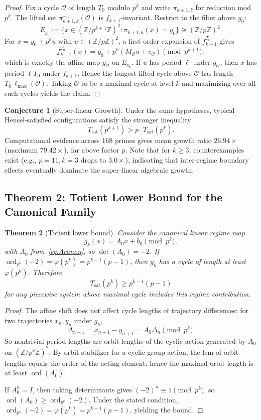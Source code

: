 \documentclass[11pt]{article}
\theoremstyle{plain}
\newtheorem{theorem}{Theorem}[section]
\theoremstyle{definition}
\newtheorem{conjecture}[theorem]{Conjecture}
\newcommand{\Z}{\mathbb{Z}}
\begin{document}
\begin{proof}
Fix a cycle $\mathcal{O}$ of length $T_0$ modulo $p^k$ and write $\pi_{k+1,k}$ for reduction mod $p^k$. The lifted set $\pi_{k+1,k}^{-1}(\mathcal{O})$ is $f_{k+1}$-invariant. Restrict to the fiber above $y_0$:
\[
E_{y_0}:=\{x\in(\Z/p^{k+1}\Z)^2:\pi_{k+1,k}(x)=y_0\}\cong(\Z/p\Z)^2.
\]
For $x=y_0+p^ku$ with $u\in(\Z/p\Z)^2$, a first-order expansion of $f_{k+1}^{T_0}$ gives
\[
f_{k+1}^{T_0}(x)=y_0+p^k(M_{\mathcal{O}}u+c_{\mathcal{O}})\pmod{p^{k+1}},
\]
which is exactly the affine map $g_{\mathcal{O}}$ on $E_{y_0}$. If $u$ has period $\ell$ under $g_{\mathcal{O}}$, then $x$ has period $\ell T_0$ under $f_{k+1}$. Hence the longest lifted cycle above $\mathcal{O}$ has length $T_0\,\ell_{\max}(\mathcal{O})$. Taking $\mathcal{O}$ to be a maximal cycle at level $k$ and maximizing over all such cycles yields the claim.
\end{proof}

\begin{conjecture}[Super-linear Growth]
\label{conj:superlinear_growth}
Under the same hypotheses, typical Hensel-satisfied configurations satisfy the stronger inequality
\[
T_{\mathrm{sat}}(p^{k+1}) > p\cdot T_{\mathrm{sat}}(p^k).
\]
Computational evidence across 168 primes gives mean growth ratio $26.94\times$ (maximum $79.42\times$), far above factor $p$.
Note that for $k \ge 3$, counterexamples exist (e.g., $p=11, k=3$ drops to $3.0\times$), indicating that inter-regime boundary effects eventually dominate the super-linear algebraic growth.
\end{conjecture}

\subsection{Theorem 2: Totient Lower Bound for the Canonical Family}

\begin{theorem}[Totient lower bound]
\label{thm:lowerbound}
Consider the canonical linear regime map
\[
g_k(x)=A_0x+b_0 \pmod{p^k},
\]
with $A_0$ from~\eqref{eq:Acanon}, so $\det(A_0)=-2$. If $\operatorname{ord}_{p^k}(-2)=\varphi(p^k)=p^{k-1}(p-1)$, then $g_k$ has a cycle of length at least $\varphi(p^k)$. Therefore
\[
T_{\mathrm{sat}}(p^k)\ge p^{k-1}(p-1)
\]
for any piecewise system whose maximal cycle includes this regime contribution.
\end{theorem}

\begin{proof}
The affine shift does not affect cycle lengths of trajectory differences: for two trajectories $x_n,y_n$ under $g_k$,
\[
\Delta_{n+1}=x_{n+1}-y_{n+1}=A_0\Delta_n \pmod{p^k}.
\]
So nontrivial period lengths are orbit lengths of the cyclic action generated by $A_0$ on $(\Z/p^k\Z)^2$. By orbit-stabilizer for a cyclic group action, the lcm of orbit lengths equals the order of the acting element; hence the maximal orbit length is at least $\operatorname{ord}(A_0)$.

If $A_0^n=I$, then taking determinants gives $(-2)^n\equiv 1\pmod{p^k}$, so $\operatorname{ord}(A_0)\ge \operatorname{ord}_{p^k}(-2)$. Under the stated condition, $\operatorname{ord}_{p^k}(-2)=\varphi(p^k)=p^{k-1}(p-1)$, yielding the bound.
\end{proof}
\end{document}

